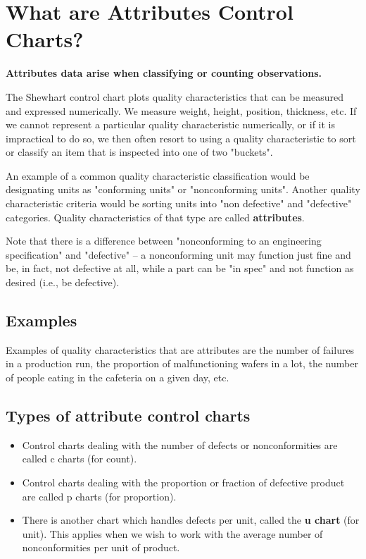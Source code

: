 \documentclass[11pt]{article} %
\begin{document}
\section{What are Attributes Control Charts?}

\textbf{Attributes data arise when classifying or counting observations.}  

The Shewhart control chart plots quality characteristics that can be measured and expressed numerically. We measure weight, height, position, thickness, etc. If we cannot represent a particular quality characteristic numerically, or if it is impractical to do so, we then often resort to using a quality characteristic to sort or classify an item that is inspected into one of two "buckets".


An example of a common quality characteristic classification would be designating units as "conforming units" or "nonconforming units". Another quality characteristic criteria would be sorting units into "non defective" and "defective" categories. Quality characteristics of that type are called \textbf{attributes}.


Note that there is a difference between "nonconforming to an engineering specification" and "defective" -- a nonconforming unit may function just fine and be, in fact, not defective at all, while a part can be "in spec" and not function as desired (i.e., be defective).
\subsection{Examples}
Examples of quality characteristics that are attributes are the number of failures in a production run, the proportion of malfunctioning wafers in a lot, the number of people eating in the cafeteria on a given day, etc.

\subsection{Types of attribute control charts}	 
\begin{itemize}
\item Control charts dealing with the number of defects or nonconformities are called c charts (for count).
\item Control charts dealing with the proportion or fraction of defective product are called  p charts (for proportion).
\item 
There is another chart which handles defects per unit, called the \textbf{u chart} (for unit). This applies when we wish to work with the average number of nonconformities per unit of product.
\end{itemize}
\end{document}
